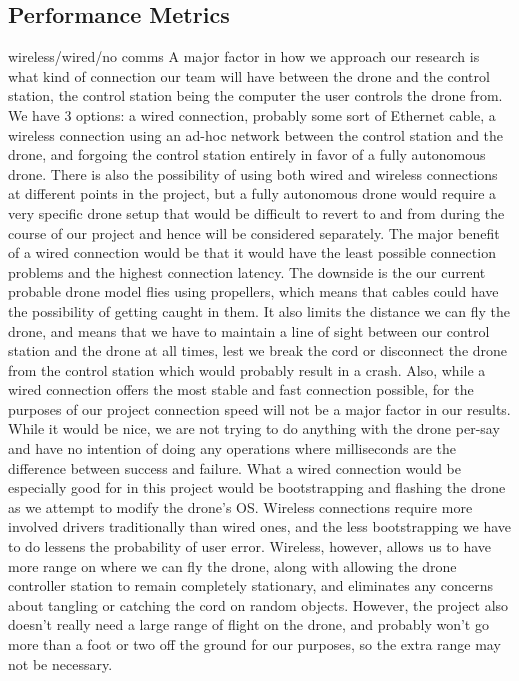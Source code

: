 \documentclass[IEEEtran,letterpaper,10pt,titlepage,draftclsnofoot,onecolumn]{article}
\begin{document}
\subsection*{Performance Metrics}
wireless/wired/no comms
A major factor in how we approach our research is what kind of connection our team will have between the drone and the control station, the control station being the computer the user controls the drone from. 
We have 3 options: a wired connection, probably some sort of Ethernet cable, a wireless connection using an ad-hoc network between the control station and the drone, and forgoing the control station entirely in favor of a fully autonomous drone. 
There is also the possibility of using both wired and wireless connections at different points in the project, but a fully autonomous drone would require a very specific drone setup that would be difficult to revert to and from during the course of our project and hence will be considered separately. 
The major benefit of a wired connection would be that it would have the least possible connection problems and the highest connection latency. 
The downside is the our current probable drone model flies using propellers, which means that cables could have the possibility of getting caught in them. 
It also limits the distance we can fly the drone, and means that we have to maintain a line of sight between our control station and the drone at all times, lest we break the cord or disconnect the drone from the control station which would probably result in a crash. 
Also, while a wired connection offers the most stable and fast connection possible, for the purposes of our project connection speed will not be a major factor in our results. 
While it would be nice, we are not trying to do anything with the drone per-say and have no intention of doing any operations where milliseconds are the difference between success and failure. 
What a wired connection would be especially good for in this project would be bootstrapping and flashing the drone as we attempt to modify the drone's OS. 
Wireless connections require more involved drivers traditionally than wired ones, and the less bootstrapping we have to do lessens the probability of user error. 
Wireless, however, allows us to have more range on where we can fly the drone, along with allowing the drone controller station to remain completely stationary, and eliminates any concerns about tangling or catching the cord on random objects. 
However, the project also doesn't really need a large range of flight on the drone, and probably won't go more than a foot or two off the ground for our purposes, so the extra range may not be necessary. 
\end{document}
